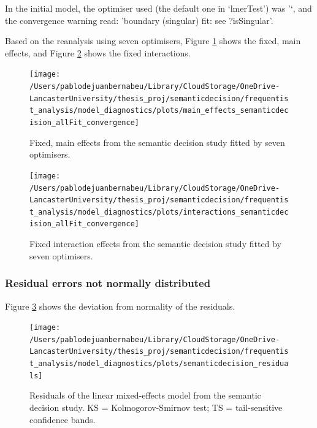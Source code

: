 \documentclass[
  12pt,
  man,floatsintext]{apa7}
\begin{document}
In the initial model, the optimiser used (the default one in `lmerTest') was '`, and the convergence warning read: 'boundary (singular) fit: see ?isSingular'.

Based on the reanalysis using seven optimisers, Figure \ref{fig:main-effects-semanticdecision-allFit-convergence} shows the fixed, main effects, and Figure \ref{fig:interactions-semanticdecision-allFit-convergence} shows the fixed interactions.

\begin{figure}

{\centering \texttt{[image: /Users/pablodejuanbernabeu/Library/CloudStorage/OneDrive-LancasterUniversity/thesis\_proj/semanticdecision/frequentist\_analysis/model\_diagnostics/plots/main\_effects\_semanticdecision\_allFit\_convergence]} 

}

\caption{Fixed, main effects from the semantic decision study fitted by seven optimisers.}\label{fig:main-effects-semanticdecision-allFit-convergence}
\end{figure}

\begin{figure}

{\centering \texttt{[image: /Users/pablodejuanbernabeu/Library/CloudStorage/OneDrive-LancasterUniversity/thesis\_proj/semanticdecision/frequentist\_analysis/model\_diagnostics/plots/interactions\_semanticdecision\_allFit\_convergence]} 

}

\caption{Fixed interaction effects from the semantic decision study fitted by seven optimisers.}\label{fig:interactions-semanticdecision-allFit-convergence}
\end{figure}

\hypertarget{residual-errors-not-normally-distributed-3}{%
\subsubsection{Residual errors not normally distributed}\label{residual-errors-not-normally-distributed-3}}

Figure \ref{fig:semanticdecision-residuals} shows the deviation from normality of the residuals.

\begin{figure}

{\centering \texttt{[image: /Users/pablodejuanbernabeu/Library/CloudStorage/OneDrive-LancasterUniversity/thesis\_proj/semanticdecision/frequentist\_analysis/model\_diagnostics/plots/semanticdecision\_residuals]} 

}

\caption{Residuals of the linear mixed-effects model from the semantic decision study. \linebreak KS = Kolmogorov-Smirnov test; TS = tail-sensitive confidence bands.}\label{fig:semanticdecision-residuals}
\end{figure}
\end{document}
